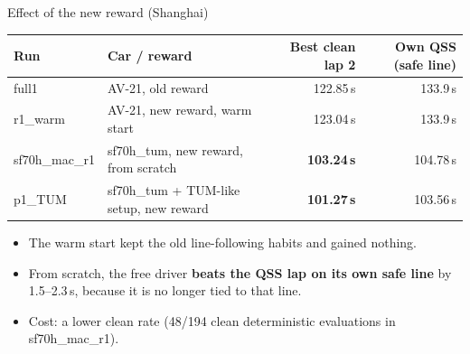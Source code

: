 \documentclass[aspectratio=169,10pt]{beamer}
\begin{document}
\begin{frame}{Effect of the new reward (Shanghai)}
  \centering
  \begin{tabular}{@{}llrr@{}}
    \toprule
    Run & Car / reward & Best clean lap 2 & Own QSS (safe line)\\
    \midrule
    full1 & AV-21, old reward & 122.85\,s & 133.9\,s\\
    r1\_warm & AV-21, new reward, warm start & 123.04\,s & 133.9\,s\\
    sf70h\_mac\_r1 & sf70h\_tum, new reward, from scratch & \textbf{103.24\,s} & 104.78\,s\\
    p1\_TUM & sf70h\_tum + TUM-like setup, new reward & \textbf{101.27\,s} & 103.56\,s\\
    \bottomrule
  \end{tabular}
  \bigskip
  \raggedright
  \begin{itemize}
    \item The warm start kept the old line-following habits and gained nothing.
    \item From scratch, the free driver \textbf{beats the QSS lap on its own safe line} by 1.5--2.3\,s, because it is no longer tied to that line.
    \item Cost: a lower clean rate (48/194 clean deterministic evaluations in sf70h\_mac\_r1).
  \end{itemize}
\end{frame}
\end{document}

